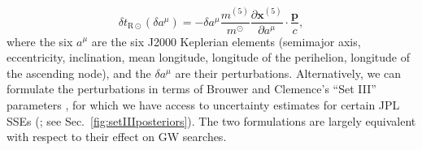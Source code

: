 \documentclass[iop,apj,twocolappendix]{emulateapj}
\begin{document}
\begin{itemize}
\begin{equation}
\label{eq:orbitperturb}
    \delta t_{\mathrm{R}\odot}(\delta a^\mu) = -\delta a^\mu
    \frac{m^{(5)}}{m^\odot} \frac{\partial \mathbf{x}^{(5)}}{\partial a^\mu} \cdot \frac{\mathbf{p}}{c},
\end{equation}
%
where the six $a^\mu$ are the six J2000 Keplerian elements (semimajor axis, eccentricity, inclination, mean longitude, longitude of the perihelion, longitude of the ascending node), and the $\delta a^\mu$ are their perturbations. Alternatively, we can formulate the perturbations in terms of Brouwer and Clemence's ``Set III'' parameters \citep{1961mcm..book.....B}, for which we have access to uncertainty estimates for certain JPL SSEs (\citealt{de434,de438}; see Sec.\ \ref{fig:setIIIposteriors}). The two formulations are largely equivalent with respect to their effect on GW searches.


\end{itemize}
\end{document}

